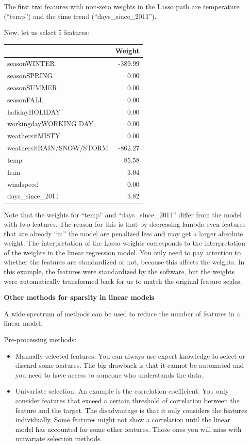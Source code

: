 \documentclass[
  10pt,
]{scrbook}
\providecommand{\tightlist}{%
  \setlength{\itemsep}{0pt}\setlength{\parskip}{0pt}}
\begin{document}
The first two features with non-zero weights in the Lasso path are temperature (``temp'') and the time trend (``days\_since\_2011'').

Now, let us select 5 features:

\begin{table}
\centering
\begin{tabular}{lr}
\toprule
  & Weight\\
\midrule
seasonWINTER & -389.99\\
seasonSPRING & 0.00\\
seasonSUMMER & 0.00\\
seasonFALL & 0.00\\
holidayHOLIDAY & 0.00\\
\addlinespace
workingdayWORKING DAY & 0.00\\
weathersitMISTY & 0.00\\
weathersitRAIN/SNOW/STORM & -862.27\\
temp & 85.58\\
hum & -3.04\\
\addlinespace
windspeed & 0.00\\
days\_since\_2011 & 3.82\\
\bottomrule
\end{tabular}
\end{table}

Note that the weights for ``temp'' and ``days\_since\_2011'' differ from the model with two features.
The reason for this is that by decreasing lambda even features that are already ``in'' the model are penalized less and may get a larger absolute weight.
The interpretation of the Lasso weights corresponds to the interpretation of the weights in the linear regression model.
You only need to pay attention to whether the features are standardized or not, because this affects the weights.
In this example, the features were standardized by the software, but the weights were automatically transformed back for us to match the original feature scales.

\textbf{Other methods for sparsity in linear models}

A wide spectrum of methods can be used to reduce the number of features in a linear model.

Pre-processing methods:

\begin{itemize}
\tightlist
\item
  Manually selected features:
  You can always use expert knowledge to select or discard some features.
  The big drawback is that it cannot be automated and you need to have access to someone who understands the data.
\item
  Univariate selection:
  An example is the correlation coefficient.
  You only consider features that exceed a certain threshold of correlation between the feature and the target.
  The disadvantage is that it only considers the features individually.
  Some features might not show a correlation until the linear model has accounted for some other features.
  Those ones you will miss with univariate selection methods.
\end{itemize}
\end{document}
